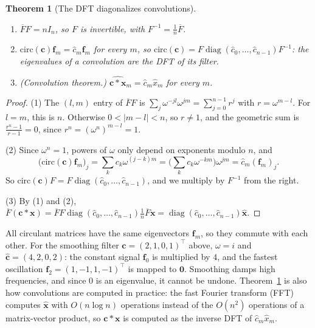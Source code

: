 \documentclass[11pt]{article}
\theoremstyle{definition}
\theoremstyle{plain}
\newtheorem{theorem}[definition]{Theorem}
\theoremstyle{remark}
\DeclareMathOperator{\diag}{diag}
\begin{document}
\begin{theorem}[The DFT diagonalizes convolutions]\label{thm:circulant-dft}
    \begin{enumerate}
        \item $\overline{F}F = nI_n$, so $F$ is invertible, with $F^{-1} = \frac{1}{n}\overline{F}$.
        \item $\mathrm{circ}(\mathbf{c})\mathbf{f}_m = \hat{c}_m\mathbf{f}_m$ for every $m$, so $\mathrm{circ}(\mathbf{c}) = F\diag(\hat{c}_0, \ldots, \hat{c}_{n-1})F^{-1}$: the eigenvalues of a convolution are the DFT of its filter.
        \item (Convolution theorem.) $\widehat{\mathbf{c} \ast \mathbf{x}}_m = \hat{c}_m\hat{x}_m$ for every $m$.
    \end{enumerate}
\end{theorem}

\begin{proof}
    (1) The $(l, m)$ entry of $\overline{F}F$ is $\sum_j \omega^{-jl}\omega^{jm} = \sum_{j=0}^{n-1} r^j$ with $r = \omega^{m-l}$. For $l = m$, this is $n$. Otherwise $0 < |m - l| < n$, so $r \neq 1$, and the geometric sum is $\frac{r^n - 1}{r - 1} = 0$, since $r^n = (\omega^n)^{m-l} = 1$.

    (2) Since $\omega^n = 1$, powers of $\omega$ only depend on exponents modulo $n$, and
    \[\big(\mathrm{circ}(\mathbf{c})\mathbf{f}_m\big)_j = \sum_k c_k\omega^{(j-k)m} = \Big(\sum_k c_k\omega^{-km}\Big)\omega^{jm} = \hat{c}_m(\mathbf{f}_m)_j.\]
    So $\mathrm{circ}(\mathbf{c})F = F\diag(\hat{c}_0, \ldots, \hat{c}_{n-1})$, and we multiply by $F^{-1}$ from the right.

    (3) By (1) and (2), $\overline{F}(\mathbf{c} \ast \mathbf{x}) = \overline{F}F\diag(\hat{c}_0, \ldots, \hat{c}_{n-1})\frac{1}{n}\overline{F}\mathbf{x} = \diag(\hat{c}_0, \ldots, \hat{c}_{n-1})\hat{\mathbf{x}}$.
\end{proof}

All circulant matrices have the same eigenvectors $\mathbf{f}_m$, so they commute with each other. For the smoothing filter $\mathbf{c} = (2, 1, 0, 1)^\top$ above, $\omega = i$ and $\hat{\mathbf{c}} = (4, 2, 0, 2)$: the constant signal $\mathbf{f}_0$ is multiplied by $4$, and the fastest oscillation $\mathbf{f}_2 = (1, -1, 1, -1)^\top$ is mapped to $\mathbf{0}$. Smoothing damps high frequencies, and since $0$ is an eigenvalue, it cannot be undone. Theorem~\ref{thm:circulant-dft} is also how convolutions are computed in practice: the fast Fourier transform (FFT) computes $\hat{\mathbf{x}}$ with $O(n\log n)$ operations instead of the $O(n^2)$ operations of a matrix-vector product, so $\mathbf{c} \ast \mathbf{x}$ is computed as the inverse DFT of $\hat{c}_m\hat{x}_m$.
\end{document}
